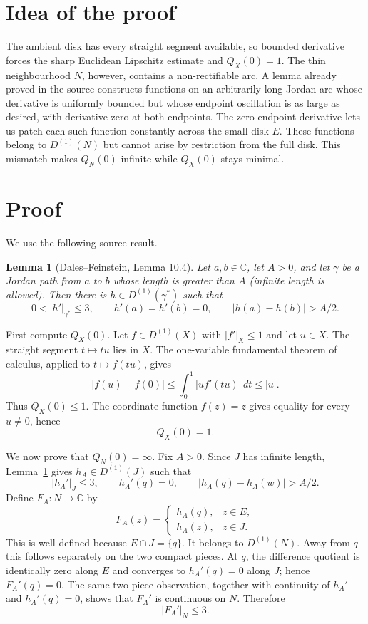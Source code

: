 \documentclass[11pt]{article}
\newtheorem{lemma}{Lemma}
\newcommand{\C}{\mathbb C}
\newcommand{\DD}{D^{(1)}}
\newcommand{\abs}[1]{\lvert#1\rvert}
\begin{document}
\section{Idea of the proof}

The ambient disk has every straight segment available, so bounded derivative
forces the sharp Euclidean Lipschitz estimate and $Q_X(0)=1$.  The thin
neighbourhood $N$, however, contains a non-rectifiable arc.  A lemma already
proved in the source constructs functions on an arbitrarily long Jordan arc
whose derivative is uniformly bounded but whose endpoint oscillation is as
large as desired, with derivative zero at both endpoints.  The zero endpoint
derivative lets us patch each such function constantly across the small disk
$E$.  These functions belong to $\DD(N)$ but cannot arise by restriction from
the full disk.  This mismatch makes $Q_N(0)$ infinite while $Q_X(0)$ stays
minimal.

\section{Proof}

We use the following source result.

\begin{lemma}[Dales--Feinstein, Lemma 10.4]\label{lem:longarc}
Let $a,b\in\C$, let $A>0$, and let $\gamma$ be a Jordan path from $a$ to $b$
whose length is greater than $A$ (infinite length is allowed).  Then there is
$h\in\DD(\gamma^*)$ such that
\[
 0<\abs{h'}_{\gamma^*}\le3,
 \qquad h'(a)=h'(b)=0,
 \qquad \abs{h(a)-h(b)}>A/2.
\]
\end{lemma}

First compute $Q_X(0)$.  Let $f\in\DD(X)$ with $\abs{f'}_X\le1$ and let
$u\in X$.  The straight segment $t\mapsto tu$ lies in $X$.  The one-variable
fundamental theorem of calculus, applied to $t\mapsto f(tu)$, gives
\[
 \abs{f(u)-f(0)}
 \le \int_0^1 \abs{u f'(tu)}\,dt
 \le \abs u.
\]
Thus $Q_X(0)\le1$.  The coordinate function $f(z)=z$ gives equality for every
$u\ne0$, hence
\[
 Q_X(0)=1.\tag{1}
\]

We now prove that $Q_N(0)=\infty$.  Fix $A>0$.  Since $J$ has infinite
length, Lemma~\ref{lem:longarc} gives $h_A\in\DD(J)$ such that
\[
 \abs{h_A'}_J\le3,\qquad h_A'(q)=0,\qquad
 \abs{h_A(q)-h_A(w)}>A/2.
\]
Define $F_A:N\to\C$ by
\[
 F_A(z)=
 \begin{cases}
   h_A(q),&z\in E,\\
   h_A(z),&z\in J.
 \end{cases}
\]
This is well defined because $E\cap J=\{q\}$.  It belongs to $\DD(N)$.
Away from $q$ this follows separately on the two compact pieces.  At $q$, the
difference quotient is identically zero along $E$ and converges to
$h_A'(q)=0$ along $J$; hence $F_A'(q)=0$.  The same two-piece observation,
together with continuity of $h_A'$ and $h_A'(q)=0$, shows that $F_A'$ is
continuous on $N$.  Therefore
\[
 \abs{F_A'}_N\le3.
\]
\end{document}
